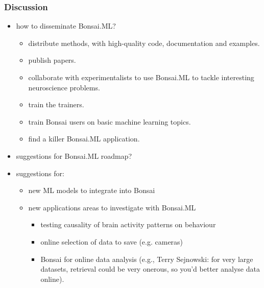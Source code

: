\documentclass{beamer}
\begin{document}
\begin{frame}
    \frametitle{Discussion}

    \begin{itemize}

        \item how to disseminate Bonsai.ML?
            \begin{itemize}

                \item distribute methods, with high-quality code,
                    documentation and examples.

                \item publish papers.

                \item collaborate with experimentalists to use Bonsai.ML
                    to tackle interesting neuroscience problems.

                \item train the trainers.

                \item train Bonsai users on basic machine learning topics.

                \item find a killer Bonsai.ML application.

            \end{itemize}

        \item suggestions for Bonsai.ML roadmap?

        \item suggestions for:

            \begin{itemize}
                \item new ML models to integrate into Bonsai
                \item new applications areas to investigate with Bonsai.ML

                    \begin{itemize}

                        \item testing causality of brain activity patterns on
                            behaviour

                        \item online selection of data to save (e.g. cameras)

                        \item Bonsai for online data analysis (e.g., Terry
                            Sejnowski: for very large datasets, retrieval could
                            be very onerous, so you'd better analyse data
                            online).
                    \end{itemize}

            \end{itemize}

    \end{itemize}

\end{frame}
\end{document}
